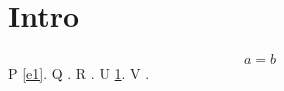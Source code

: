 \documentclass{article}
\begin{document}
\section{Intro}\label{s1}
\begin{equation}a=b\label{e1}\end{equation}
P \cref{e1}. Q . R . U \cref{s1}. V .
\end{document}
